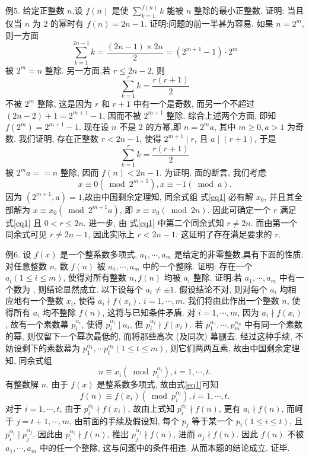 例5. 给定正整数 $n$,设 $f(n)$ 是使 $\sum_{k=1}^{f(n)} k$ 能被 $n$ 整除的最小正整数.
证明: 当且仅当 $n$ 为 2 的幂时有 $f(n)=2 n-1$.
证明:问题的前一半甚为容易.
如果 $n=2^m$, 则一方面
$$
\sum_{k=1}^{2 n-1} k=\frac{(2 n-1) \times 2 n}{2}=\left(2^{m+1}-1\right) \cdot 2^m
$$
被 $2^m=n$ 整除.
另一方面,若 $r \leqslant 2 n-2$, 则
$$
\sum_{k=1}^r k=\frac{r(r+1)}{2}
$$
不被 $2^m$ 整除, 这是因为 $r$ 和 $r+1$ 中有一个是奇数, 而另一个不超过 $(2 n- 2)+1=2^{m+1}-1$, 因而不被 $2^{m+1}$ 整除.
综合上述两个方面, 即知 $f\left(2^m\right)=2^{m+1}-1$.
现在设 $n$ 不是 2 的方幂,即 $n=2^m a$, 其中 $m \geqslant 0, a>1$ 为奇数.
我们证明, 存在正整数 $r<2 n-1$, 使得 $2^{m+1} \mid r$, 且 $a \mid(r+1)$, 于是
$$
\sum_{k=1}^r k=\frac{r(r+1)}{2}
$$
被 $2^m a==n$ 整除, 因而 $f(n)<2 n-1$.
为证明.
面的断言, 我们考虑
$$
x \equiv 0\left(\bmod 2^{m+1}\right), x \equiv-1(\bmod a) . \label{eq1}
$$
因为 $\left(2^{m+1}, a\right)=1$,故由中国剩余定理知, 同余式组 式\ref{eq1} 必有解 $x_0$, 并且其全部解为 $x \equiv x_0\left(\bmod 2^{m+1} a\right)$, 即 $x \equiv x_0(\bmod 2 n)$. 因此可确定一个 $r$ 满足 式\ref{eq1} 且 $0<r \leqslant 2 n$. 进一步, 由 式\ref{eq1} 中第二个同余式知 $r \neq 2 n$. 而由第一个同余式可见 $r \neq 2 n-1$, 因此实际上 $r<2 n-1$. 这证明了存在满足要求的 $r$.



例6. 设 $f(x)$ 是一个整系数多项式, $a_1, \cdots, a_m$ 是给定的非零整数,具有下面的性质: 对任意整数 $n$, 数 $f(n)$ 被 $a_1, \cdots, a_m$ 中的一个整除.
证明: 存在一个 $a_i(1 \leqslant i \leqslant m)$, 使得对所有整数 $n, f(n)$ 均被 $a_i$ 整除.
证明:若 $a_1, \cdots, a_m$ 中有一个数为  , 则结论显然成立.
以下设每个 $a_i \neq \pm 1$. 假设结论不对, 则对每个 $a_i$ 均相应地有一个整数 $x_i$, 使得 $a_i \nmid f\left(x_i\right)$. $i=1, \cdots, m$. 我们将由此作出一个整数 $n$, 使得所有 $a_i$ 均不整除 $f(n)$, 这将与已知条件矛盾.
对 $i=1, \cdots, m$, 因为 $a_i \nmid f\left(x_i\right)$, 故有一个素数幕 $p_i^{\alpha_i}$, 使得 $p_i^{\alpha_i} \mid a_i$, 但 $p_i^{\alpha_i} \nmid f\left(x_i\right)$. 若 $p_1^{\alpha_1}, \cdots, p_m^{\alpha_n}$ 中有同一个素数的幂, 则仅留下一个幂次最低的, 而将那些高次 (及同次) 幕删去.
经过这种手续, 不妨设剩下的素数幕为 $p_1^{\alpha_1}, \cdots p_t^{\alpha_t}(1 \leqslant t \leqslant m)$, 则它们两两互素, 故由中国剩余定理知, 同余式组
$$
n \equiv x_i\left(\bmod p_i^{\alpha_i}\right), i=1, \cdots, t. \label{eq1}
$$
有整数解 $n$.
由于 $f(x)$ 是整系数多项式, 故由式\ref{eq1}可知
$$
f(n) \equiv f\left(x_i\right)\left(\bmod p_i^{\alpha_i}\right), i=1, \cdots, t .
$$
对于 $i=1, \cdots, t$, 由于 $p_i^{\alpha_i} \nmid f\left(x_i\right)$, 故由上式知 $p_i^{\alpha_i} \nmid f(n)$, 更有 $a_i \nmid f(n)$, 而㞹 于 $j=t+1, \cdots, m$, 由前面的手续及假设知, 每个 $p_j$ 等于某一个 $p_i(1 \leqslant i \leqslant t)$, 且 $p_i^{\alpha_i} \mid p_j^{\alpha_j}$. 因此由 $p_i^{\alpha_i} \nmid f(n)$, 推出 $p_j^{\alpha_j} \nmid f(n)$, 进而 $a_j \nmid f(n)$. 因此 $f(n)$ 不被 $a_1, \cdots, a_m$ 中的任一个整除, 这与问题中的条件相违.
从而本题的结论成立.
证毕.


